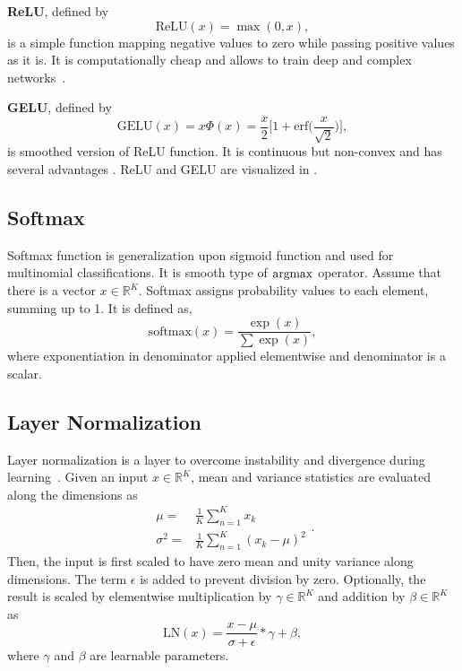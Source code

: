 \textbf{ReLU}, defined by
\begin{equation}
\label{eqn:relu_fcn}
\textrm{ReLU}(x) = \max(0, x),
\end{equation}
is a simple function mapping negative values to zero while passing positive values as it is. It is computationally cheap and allows to train deep and complex networks~\cite{glorot_deep_2011}.

\textbf{GELU}, defined by
\begin{equation}
\label{eqn:gelu_fcn}
\textrm{GELU}(x) = x \Phi(x) = \frac{x}{2} \bigg[ 1 + \textrm{erf} \Big( \frac{x}{\sqrt{2}} \Big) \bigg],
\end{equation}
is smoothed version of ReLU function. It is continuous but non-convex and has several advantages \cite{hendrycks_gaussian_2020}. ReLU and GELU are visualized in  . 

\subsection{Softmax}

Softmax function is generalization upon sigmoid function and used for multinomial classifications. It is smooth type of $\operatorname{\textup{argmax}}$ operator. Assume that there is a vector $x \in \mathbb{R}^K$. Softmax assigns probability values to each element, summing up to 1. It is defined as,
\begin{equation}
\label{eqn:softmax_fcn}
\text{softmax}(x) = \frac{\exp(x)}{\sum \exp(x)},
\end{equation}
where exponentiation in denominator applied elementwise and denominator is a scalar.

\subsection{Layer Normalization}

Layer normalization is a layer to overcome instability and divergence during learning~\cite{ba_layer_2016}. 
Given an input $x \in \mathbb{R}^K$, mean and variance statistics are evaluated along the dimensions as  
\begin{equation}
\label{eq:layernorm_statistics}
\begin{split}
\mu = & \frac{1}{K} \sum_{n=1}^{K} x_k \\
\sigma^2 = & \frac{1}{K} \sum_{n=1}^{K} (x_k-\mu)^2
\end{split}.
\end{equation} 
Then, the input is first scaled to have zero mean and unity variance along dimensions. 
The term $\epsilon$ is added to prevent division by zero. 
Optionally, the result is scaled by elementwise multiplication by $\gamma \in \mathbb{R}^K$ and addition by $\beta \in \mathbb{R}^K$ as
\begin{equation}
\label{eqn:layernorm}
\mathrm{LN}(x) = \frac{x-\mu}{\sigma+\epsilon} * \gamma + \beta,
\end{equation}
where $\gamma$ and $\beta$ are learnable parameters. 

